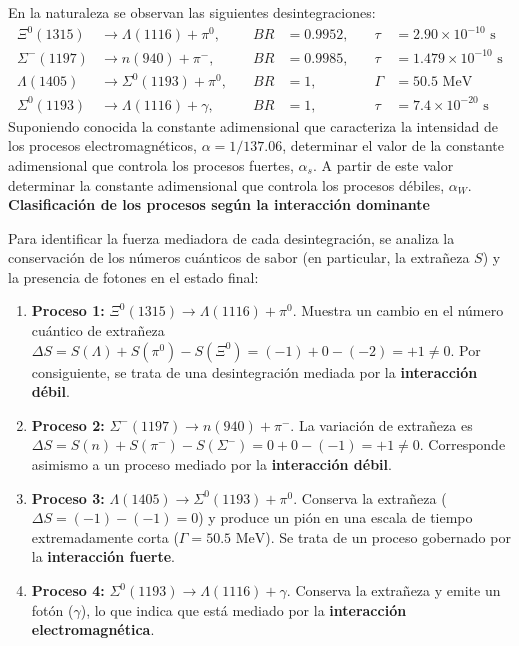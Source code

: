 \newpage
\begin{problema}
En la naturaleza se observan las siguientes desintegraciones:
\begin{align*}
    \Xi^0(1315) &\to \Lambda(1116) + \pi^0, \quad &BR &= 0.9952, \quad &\tau &= 2.90 \times 10^{-10} \text{ s} \\
    \Sigma^-(1197) &\to n(940) + \pi^-, \quad &BR &= 0.9985, \quad &\tau &= 1.479 \times 10^{-10} \text{ s} \\
    \Lambda(1405) &\to \Sigma^0(1193) + \pi^0, \quad &BR &= 1, \quad &\Gamma &= 50.5 \text{ MeV} \\
    \Sigma^0(1193) &\to \Lambda(1116) + \gamma, \quad &BR &= 1, \quad &\tau &= 7.4 \times 10^{-20} \text{ s}
\end{align*}
Suponiendo conocida la constante adimensional que caracteriza la intensidad de los procesos electromagnéticos, $\alpha = 1/137.06$, determinar el valor de la constante adimensional que controla los procesos fuertes, $\alpha_s$. A partir de este valor determinar la constante adimensional que controla los procesos débiles, $\alpha_W$.
\tcblower
\textbf{Clasificación de los procesos según la interacción dominante}

Para identificar la fuerza mediadora de cada desintegración, se analiza la conservación de los números cuánticos de sabor (en particular, la extrañeza $S$) y la presencia de fotones en el estado final:
\begin{enumerate}[label=\arabic*.]
    \item \textbf{Proceso 1:} $\Xi^0(1315) \to \Lambda(1116) + \pi^0$. Muestra un cambio en el número cuántico de extrañeza $\Delta S = S(\Lambda) + S(\pi^0) - S(\Xi^0) = (-1) + 0 - (-2) = +1 \neq 0$. Por consiguiente, se trata de una desintegración mediada por la \textbf{interacción débil}.
    \item \textbf{Proceso 2:} $\Sigma^-(1197) \to n(940) + \pi^-$. La variación de extrañeza es $\Delta S = S(n) + S(\pi^-) - S(\Sigma^-) = 0 + 0 - (-1) = +1 \neq 0$. Corresponde asimismo a un proceso mediado por la \textbf{interacción débil}.
    \item \textbf{Proceso 3:} $\Lambda(1405) \to \Sigma^0(1193) + \pi^0$. Conserva la extrañeza ($\Delta S = (-1) - (-1) = 0$) y produce un pión en una escala de tiempo extremadamente corta ($\Gamma = 50.5 \text{ MeV}$). Se trata de un proceso gobernado por la \textbf{interacción fuerte}.
    \item \textbf{Proceso 4:} $\Sigma^0(1193) \to \Lambda(1116) + \gamma$. Conserva la extrañeza y emite un fotón ($\gamma$), lo que indica que está mediado por la \textbf{interacción electromagnética}.
\end{enumerate}


\end{problema}
